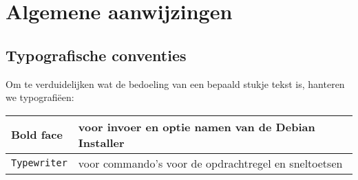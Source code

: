 \section{Algemene aanwijzingen}
\subsection{Typografische conventies}
Om te verduidelijken wat de bedoeling van een bepaald stukje tekst is, hanteren we typografi\"{e}en:
\begin{table}[H]
\begin{tabular}{| l | l |}
	\hline
	\textbf{Bold face} & voor invoer en optie namen van de Debian Installer\\
	\hline
	\texttt{Typewriter} & voor commando's voor de opdrachtregel en sneltoetsen\\
	\hline
\end{tabular}
\end{table}


